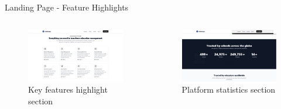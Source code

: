 \documentclass[aspectratio=169]{beamer}
\begin{document}
\begin{frame}{Landing Page - Feature Highlights}
    \begin{columns}
        \begin{figure}
            \includegraphics[width=\textwidth,height=0.6\textheight,keepaspectratio]{../pfe-pics/landing/info.png}
            \caption{Key features highlight section}
        \end{figure}
        \begin{figure}
            \includegraphics[width=\textwidth,height=0.6\textheight,keepaspectratio]{../pfe-pics/landing/stats.png}
            \caption{Platform statistics section}
        \end{figure}
    \end{columns}
\end{frame}
\end{document}
